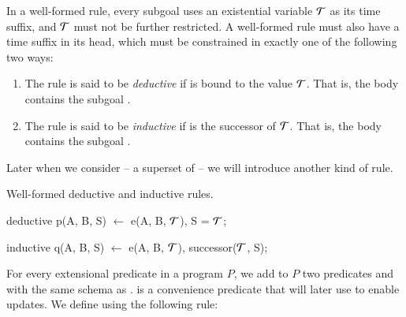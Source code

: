 %
%
In a well-formed \slang rule, every subgoal uses an existential variable $\Tau$
as its time suffix, and $\Tau$ must not be further restricted.  A well-formed
\slang rule must also have a time suffix  in its head, which must be
constrained in exactly one of the following two ways:
\begin{enumerate}
%
\item The rule is said to be \emph{deductive} if  is bound to the
value $\Tau$.  That is, the body contains the subgoal .
%
\item The rule is said to be {\em inductive} if  is the successor of
$\Tau$.  That is, the body contains the subgoal .
%
\end{enumerate}

Later when we consider \lang -- a superset of \slang -- we will
introduce another kind of rule.

\begin{example}
Well-formed deductive and inductive rules.

\begin{Dedalus}
deductive
p(A, B, S) \(\leftarrow\) e(A, B, \(\Tau\)), S = \(\Tau\);

inductive
q(A, B, S) \(\leftarrow\) e(A, B, \(\Tau\)), successor(\(\Tau\), S);
\end{Dedalus}
\end{example}

For every extensional predicate  in a \slang program $P$, we add to
$P$ two predicates  and  with the same schema
as .   is a convenience predicate that will later
use to enable updates.  We define  using the following rule:

